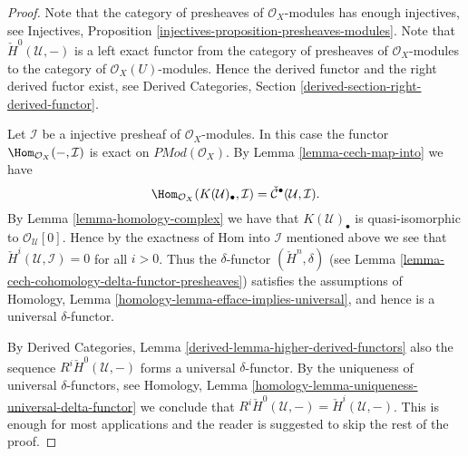 \begin{proof}
Note that the category of presheaves of $\mathcal{O}_X$-modules
has enough injectives, see
Injectives, Proposition \ref{injectives-proposition-presheaves-modules}.
Note that $\check{H}^0(\mathcal{U}, -)$ is a left exact functor
from the category of presheaves of $\mathcal{O}_X$-modules
to the category of $\mathcal{O}_X(U)$-modules.
Hence the derived functor and the right derived fuctor exist, see
Derived Categories, Section \ref{derived-section-right-derived-functor}.

\medskip\noindent
Let $\mathcal{I}$ be a injective presheaf of $\mathcal{O}_X$-modules.
In this case the functor $\Hom_{\mathcal{O}_X}(-, \mathcal{I})$
is exact on $\textit{PMod}(\mathcal{O}_X)$. By
Lemma \ref{lemma-cech-map-into} we have
$$
\Hom_{\mathcal{O}_X}(K(\mathcal{U})_\bullet, \mathcal{I})
=
\check{\mathcal{C}}^\bullet(\mathcal{U}, \mathcal{I}).
$$
By Lemma \ref{lemma-homology-complex} we have that $K(\mathcal{U})_\bullet$ is
quasi-isomorphic to $\mathcal{O}_\mathcal{U}[0]$. Hence by
the exactness of Hom into $\mathcal{I}$ mentioned above we see
that $\check{H}^i(\mathcal{U}, \mathcal{I}) = 0$ for all
$i > 0$. Thus the $\delta$-functor $(\check{H}^n, \delta)$
(see Lemma \ref{lemma-cech-cohomology-delta-functor-presheaves})
satisfies the assumptions of
Homology, Lemma \ref{homology-lemma-efface-implies-universal},
and hence is a universal $\delta$-functor.

\medskip\noindent
By
Derived Categories, Lemma \ref{derived-lemma-higher-derived-functors}
also the sequence $R^i\check{H}^0(\mathcal{U}, -)$
forms a universal $\delta$-functor. By the uniqueness of universal
$\delta$-functors, see
Homology, Lemma \ref{homology-lemma-uniqueness-universal-delta-functor}
we conclude that
$R^i\check{H}^0(\mathcal{U}, -) = \check{H}^i(\mathcal{U}, -)$.
This is enough for most applications
and the reader is suggested to skip the rest of the proof.


\end{proof}
